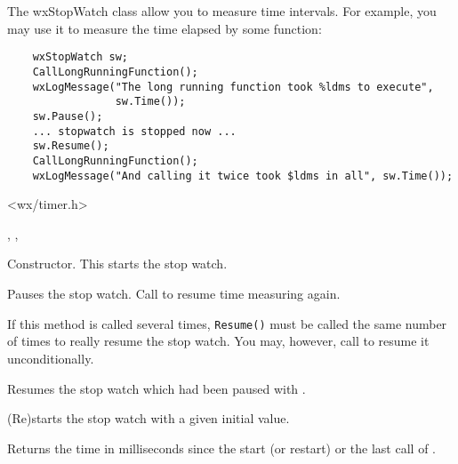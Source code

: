 \section{}\label{wxstopwatch}

The wxStopWatch class allow you to measure time intervals. For example, you may
use it to measure the time elapsed by some function:

\begin{verbatim}
    wxStopWatch sw;
    CallLongRunningFunction();
    wxLogMessage("The long running function took %ldms to execute",
                 sw.Time());
    sw.Pause();
    ... stopwatch is stopped now ...
    sw.Resume();
    CallLongRunningFunction();
    wxLogMessage("And calling it twice took $ldms in all", sw.Time());
\end{verbatim}


<wx/timer.h>


, , 


\label{wxstopwatchctor}


Constructor. This starts the stop watch.

\label{wxstopwatchpause}


Pauses the stop watch. Call  to resume 
time measuring again.

If this method is called several times, {\tt Resume()} must be called the same
number of times to really resume the stop watch. You may, however, call 
 to resume it unconditionally.

\label{wxstopwatchresume}


Resumes the stop watch which had been paused with 
.

\label{wxstopwatchstart}


(Re)starts the stop watch with a given initial value.

\label{wxstopwatchtime}

\label{wxstopwatchtime}

Returns the time in milliseconds since the start (or restart) or the last call of 
.

